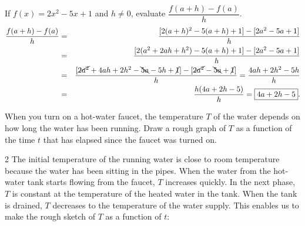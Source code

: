 \documentclass{book}
\begin{document}
\begin{Exam} If $f(x) = 2x^2-5x+1$ and $h\neq 0$, evaluate $\dfrac{f(a+h) - f(a)}{h}$.\\
\begin{eqnarray*} 
\dfrac{f(a+h) - f(a)}{h} &=& \dfrac{[2(a+h)^2-5(a+h)+1] - [2a^2-5a+1]}{h}\\
&=& \dfrac{[2(a^2+2ah+h^2)-5(a+h)+1] - [2a^2-5a+1]}{h}\\
&=& \dfrac{[\cancel{2a^2}+4ah+2h^2 -\bcancel{ 5a}-5h +\cancel{1}] - [\cancel{2a^2}-\bcancel{5a}+\cancel{1}]}{h} = \dfrac{4ah+2h^2-5h}{h}\\
& =& \dfrac{h(4a+2h-5)}{h} =\fbox{$4a+2h-5$}. 
\end{eqnarray*}
\end{Exam}\vs

\begin{Exam} When you turn on a hot-water faucet, the temperature $T$ of the water depends on how long the water has been running. Draw a rough graph of $T$ as a function of the time $t$ that has elapsed since the faucet was turned on.
\begin{multicols}{2}
The initial temperature of the running water is close to room temperature because the water has been sitting in the pipes. When the water from the hot-water tank starts flowing from the faucet, $T$ increases quickly. In the next phase, $T$ is constant at the temperature of the heated water in the tank. When the tank is drained, $T$ decreases to the temperature of the water supply. This enables us to make the rough sketch of $T$ as a function of $t$:
\begin{center}
\end{center}
\end{multicols}
\end{Exam}\vs

%
\end{document}
